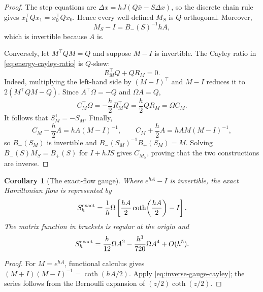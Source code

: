 \documentclass[11pt,a4paper]{article}
\newtheorem{corollary}[theorem]{Corollary}
\begin{document}
\begin{proof}
The step equations are
\(\Delta x=hJ(Q\bar x-S\Delta x)\), so the discrete chain rule gives
\(x_1^\top Qx_1=x_0^\top Qx_0\).  Hence every well-defined \(M_S\) is
\(Q\)-orthogonal.  Moreover,
\[
 M_S-I=B_-(S)^{-1}hA,
\]
which is invertible because \(A\) is.

Conversely, let \(M^\top QM=Q\) and suppose \(M-I\) is invertible.
The Cayley ratio in \cref{eq:energy-cayley-ratio} is \(Q\)-skew:
\begin{equation}\label{eq:q-skew-cayley-ratio}
 R_M^\top Q+QR_M=0.
\end{equation}
Indeed, multiplying the left-hand side by \((M-I)^\top\) and \(M-I\)
reduces it to \(2(M^\top QM-Q)\).  Since
\(A^\top\Omega=-Q\) and \(\Omega A=Q\),
\[
 C_M^\top\Omega=-\frac h2R_M^\top Q
 =\frac h2QR_M=\Omega C_M.
\]
It follows that
\(S_M^\top=-S_M\).  Finally,
\[
 C_M-\frac h2A=hA(M-I)^{-1},\qquad
 C_M+\frac h2A=hAM(M-I)^{-1},
\]
so \(B_-(S_M)\) is invertible and
\(B_-(S_M)^{-1}B_+(S_M)=M\).  Solving
\(B_-(S)M_S=B_+(S)\) for \(I+hJS\) gives
\(C_{M_S}\), proving that the two constructions are inverse.
\end{proof}

\begin{corollary}[The exact-flow gauge]
\label{cor:exact-flow-gauge}
Where \(e^{hA}-I\) is invertible, the exact Hamiltonian flow is represented
by
\begin{equation}\label{eq:exact-flow-gauge}
 S_h^{\rm exact}
 =\frac1h\Omega
 \left[
  \frac{hA}{2}\coth\!\left(\frac{hA}{2}\right)-I
 \right].
\end{equation}
The matrix function in brackets is regular at the origin and
\begin{equation}\label{eq:exact-flow-gauge-series}
 S_h^{\rm exact}
 =\frac h{12}\Omega A^2
  -\frac{h^3}{720}\Omega A^4+O(h^5).
\end{equation}
\end{corollary}

\begin{proof}
For \(M=e^{hA}\), functional calculus gives
\((M+I)(M-I)^{-1}=\coth(hA/2)\).  Apply
\cref{eq:inverse-gauge-cayley}; the series follows from the Bernoulli
expansion of \((z/2)\coth(z/2)\).
\end{proof}
\end{document}
